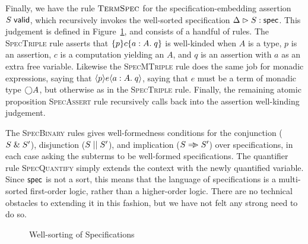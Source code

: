 Finally, we have the rule $\textsc{TermSpec}$ for the
specification-embedding assertion ${S}\;\mathsf{valid}$, which recursively
invokes the well-sorted specification ${\Delta} \vartriangleright {S} : \mathsf{spec}$. This judgement is
defined in Figure~\ref{logic-spec-ok}, and consists of a handful of
rules. The \textsc{SpecTriple} rule asserts that $\{{p}\}{c}\{{a:A}.\;{q}\}$
is well-kinded when $A$ is a type, $p$ is an assertion, $c$ is a
computation yielding an $A$, and $q$ is an assertion with $a$ as an
extra free variable.  Likewise the \textsc{SpecMTriple} rule does the
same job for monadic expressions, saying that $\langle{p}\rangle{e}\langle{a:A}.\;{q}\rangle$,
saying that $e$ must be a term of monadic type $\bigcirc{A}$, but
otherwise as in the \textsc{SpecTriple} rule.  Finally, the remaining
atomic proposition \textsc{SpecAssert} rule recursively calls back into the
assertion well-kinding judgement.


The \textsc{SpecBinary} rules gives well-formedness conditions for the
conjunction ($S \;\&\; S'$), disjunction ($S \;||\; S'$), and
implication ($S \Rightarrow\!\!\!> S'$) over specifications, in each case asking
the subterms to be well-formed specifications. The quantifier rule
\textsc{SpecQuantify} simply extends the context with the newly
quantified variable. Since $\mathsf{spec}$ is not a sort, this means that
the language of specifications is a multi-sorted first-order logic,
rather than a higher-order logic. There are no technical obstacles to
extending it in this fashion, but we have not felt any strong need to
do so.



\begin{figure}
\caption{Well-sorting of Specifications}
\label{logic-spec-ok}
\end{figure}

